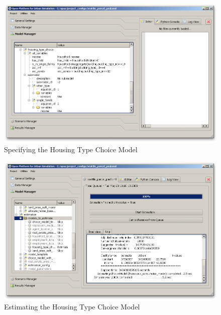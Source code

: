 \begin{figure}[htp]
\begin{center}
\includegraphics[scale=0.35]{graphics/choice-model-specification.png}
\end{center}
\caption{Specifying the Housing Type Choice Model}
\label{fig:choice-model-specification}
\end{figure}

\begin{figure}[htp]
\begin{center}
\includegraphics[scale=0.35]{graphics/choice-model-estimation.png}
\end{center}
\caption{Estimating the Housing Type Choice Model}
\label{fig:choice-model-estimation}
\end{figure}

